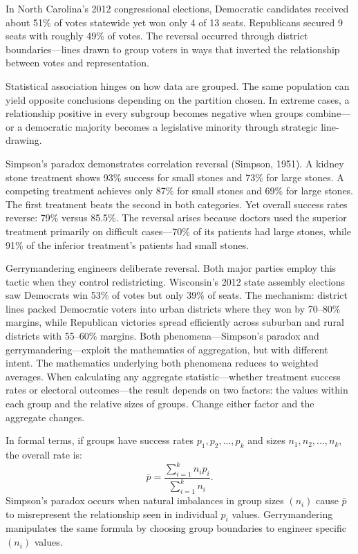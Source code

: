 In North Carolina's 2012 congressional elections, Democratic candidates received about 51\% of votes statewide yet won only 4 of 13 seats. Republicans secured 9 seats with roughly 49\% of votes. The reversal occurred through district boundaries—lines drawn to group voters in ways that inverted the relationship between votes and representation.

Statistical association hinges on how data are grouped. The same population can yield opposite conclusions depending on the partition chosen. In extreme cases, a relationship positive in every subgroup becomes negative when groups combine—or a democratic majority becomes a legislative minority through strategic line-drawing.

Simpson's paradox demonstrates correlation reversal (Simpson, 1951). A kidney stone treatment shows 93\% success for small stones and 73\% for large stones. A competing treatment achieves only 87\% for small stones and 69\% for large stones. The first treatment beats the second in both categories. Yet overall success rates reverse: 79\% versus 85.5\%. The reversal arises because doctors used the superior treatment primarily on difficult cases—70\% of its patients had large stones, while 91\% of the inferior treatment's patients had small stones.

Gerrymandering engineers deliberate reversal. Both major parties employ this tactic when they control redistricting. Wisconsin's 2012 state assembly elections saw Democrats win 53\% of votes but only 39\% of seats. The mechanism: district lines packed Democratic voters into urban districts where they won by 70–80\% margins, while Republican victories spread efficiently across suburban and rural districts with 55–60\% margins. Both phenomena—Simpson's paradox and gerrymandering—exploit the mathematics of aggregation, but with different intent. The mathematics underlying both phenomena reduces to weighted averages. When calculating any aggregate statistic—whether treatment success rates or electoral outcomes—the result depends on two factors: the values within each group and the relative sizes of groups. Change either factor and the aggregate changes.

In formal terms, if groups have success rates $p_1, p_2, ..., p_k$ and sizes $n_1, n_2, ..., n_k$, the overall rate is:
\[
\bar{p} = \frac{\sum_{i=1}^k n_i p_i}{\sum_{i=1}^k n_i}.
\]
Simpson's paradox occurs when natural imbalances in group sizes $(n_i)$ cause $\bar{p}$ to misrepresent the relationship seen in individual $p_i$ values. Gerrymandering manipulates the same formula by choosing group boundaries to engineer specific $(n_i)$ values.

